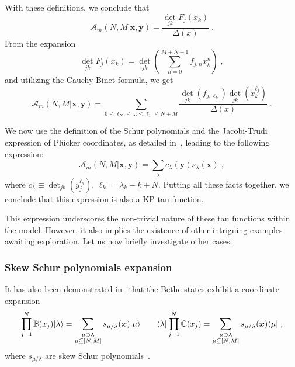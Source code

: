 \documentclass[a4paper,11pt]{amsart}
\begin{document}
With these definitions, we conclude that
\begin{equation}
\mathcal{A}_m(N,M|\bm{x}, \bm{y}) =\frac{\det_{jk} F_j(x_k)}{\Delta(x)}\; .
\end{equation}
From the expansion 
\begin{equation}
  \det_{jk} F_j(x_k) = \det_{jk} \left(  \sum_{n=0}^{M + N -1} f_{j, n} x_k^n \right) \; ,
\end{equation}
and utilizing the Cauchy-Binet formula, we get
\begin{equation}
    \mathcal{A}_m(N,M|\bm{x}, \bm{y})
  = \sum_{0\leq \ell_N\leq \dots \leq \ell_1 \leq N+M}
  \frac{\det_{jk}(f_{j, \ell_k}) \det_{jk}(x_k^{\ell_j})}{\Delta(x)}\; . 
\end{equation}

We now use the definition of the Schur polynomials and the
Jacobi-Trudi expression of Plücker coordinates, as detailed
in~\cite{Alexandrov:2012tr}, leading to the following expression:
\begin{equation}
\mathcal{A}_m(N,M|\bm{x}, \bm{y}) =
\sum_{\lambda} c_\lambda(\bm{y}) s_\lambda(\bm{x}) \; ,
\end{equation}
where \(c_\lambda \equiv \det_{jk}(y_j^{\ell_k})\), \(\ell_k =
\lambda_k - k +N\).  Putting all these facts together, we conclude
that this expression is also a KP tau function.

This expression underscores the non-trivial nature of these tau
functions within the model. However, it also implies the existence of
other intriguing examples awaiting exploration. Let us now briefly
investigate other cases.



\subsubsection{Skew Schur polynomials expansion}
It has also been demonstrated in~\cite{Bogoliubov2005, Tsilevich:2006}
that the Bethe states exhibit a coordinate expansion
\begin{equation}
  \prod_{j=1}^N \mathbb{B}(x_j)\lvert\lambda\rangle  =
  \sum_{\substack{\mu \supset \lambda \\ \mu \subseteq [N,M]}} s_{\mu/\lambda}(\bm{x})\lvert\mu\rangle\qquad 
  \langle\lambda\rvert \prod_{j=1}^N \mathbb{C}(x_j) = \sum_{\substack{\mu \supset \lambda \\ \mu \subseteq [N,M]}} 
  s_{\mu/\lambda}(\bm{x})\langle\mu\rvert\; ,
\end{equation}
where \(s_{\mu/\lambda}\) are skew Schur polynomials~\cite{Macdonald:1998}.
\end{document}
